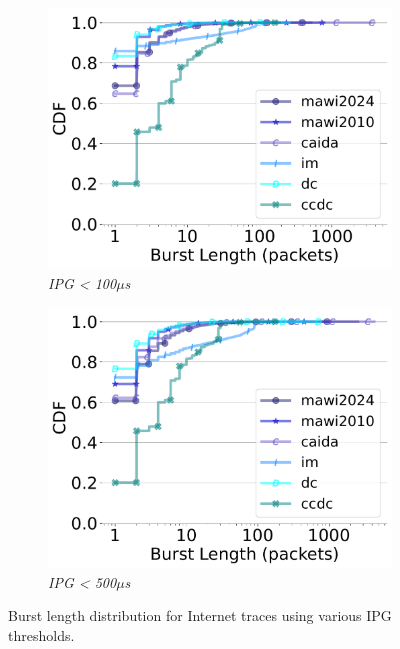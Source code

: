 \begin{figure}[t]
\begin{subfigure}[t]{.24\linewidth}
 \includegraphics[width=\linewidth]{figs/aggregate_ipg_burstsize_pkt_cdf_100.pdf}
    \vspace{-6mm}
    \caption{\small{\textit{IPG < 100$\mu$s}}}
 \end{subfigure}
 \begin{subfigure}[t]{.24\linewidth}
 \centering
        \centering\includegraphics[width=1\linewidth]{figs/aggregate_ipg_burstsize_pkt_cdf_500.pdf}
         \vspace{-6mm}
		\caption{\small{\textit{IPG < 500$\mu$s}}}
\end{subfigure}
  \vspace{-0.3cm}
    \caption{\small{Burst length distribution for Internet traces using various IPG thresholds.}}
    \label{fig:traces-all}
  \vspace{-0.2cm}
\end{figure}
